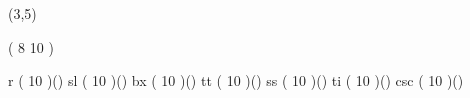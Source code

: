 %
%
%
%
%
%
%

\lhvercheck(3,5)

%
     \tablevalues                         ( 8 10 )

     \makefont \fonttwoletters r          (   10 )()
     \makefont \fonttwoletters sl         (   10 )()
     \makefont \fonttwoletters bx         (   10 )()
     \makefont \fonttwoletters tt         (   10 )()
     \makefont \fonttwoletters ss         (   10 )()
     \makefont \fonttwoletters ti         (   10 )()
     \makefont \fonttwoletters csc        (   10 )()
